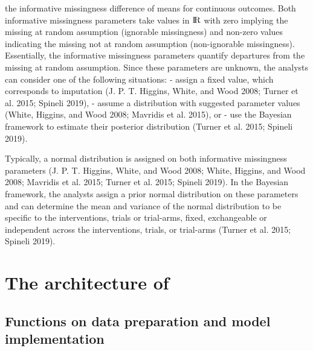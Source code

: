 the informative missingness difference of means for continuous outcomes. Both
informative missingness parameters take values in \({\rm I\!R}\) with zero implying
the missing at random assumption (ignorable missingness) and non-zero values
indicating the missing not at random assumption (non-ignorable missingness).
Essentially, the informative missingness parameters quantify departures from the
missing at random assumption. Since these parameters are unknown, the analysts can
consider one of the following situations:
- assign a fixed value, which corresponds to imputation (J. P. T. Higgins, White, and Wood 2008; Turner et al. 2015; Spineli 2019),
- assume a distribution with suggested parameter values (White, Higgins, and Wood 2008; Mavridis et al. 2015), or
- use the Bayesian framework to estimate their posterior distribution (Turner et al. 2015; Spineli 2019).

Typically, a normal distribution is assigned on both informative missingness parameters
(J. P. T. Higgins, White, and Wood 2008; White, Higgins, and Wood 2008; Mavridis et al. 2015; Turner et al. 2015; Spineli 2019). In the Bayesian
framework, the analysts assign a prior normal distribution on these parameters and
can determine the mean and variance of the normal distribution to be specific to the
interventions, trials or trial-arms, fixed, exchangeable or independent across the
interventions, trials, or trial-arms (Turner et al. 2015; Spineli 2019).

\hypertarget{the-architecture-of}{%
\section{\texorpdfstring{The architecture of }{The architecture of }}\label{the-architecture-of}}

\hypertarget{functions-on-data-preparation-and-model-implementation}{%
\subsection{Functions on data preparation and model implementation}\label{functions-on-data-preparation-and-model-implementation}}

